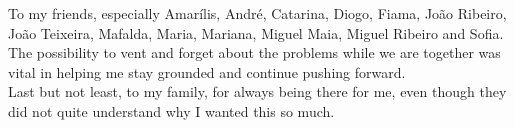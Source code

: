 To my friends, especially Amarílis, André, Catarina, Diogo, Fiama, João Ribeiro, João Teixeira, Mafalda, Maria, Mariana, Miguel Maia, Miguel Ribeiro and Sofia. The possibility to vent and forget about the problems while we are together was vital in helping me stay grounded and continue pushing forward.\\

Last but not least, to my family, for always being there for me, even though they did not quite understand why I wanted this so much. \\

\vspace{10mm}
